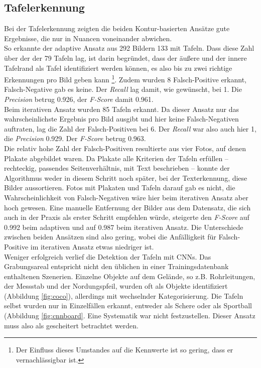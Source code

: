 \subsection{Tafelerkennung}
Bei der Tafelerkennung zeigten  die beiden Kontur-basierten Ansätze gute Ergebnisse, die nur in Nuancen voneinander abwichen.\\
So erkannte der adaptive Ansatz aus 292 Bildern 133 mit Tafeln. Dass diese Zahl über der der 79 Tafeln lag, ist darin begründet, dass der äußere und der innere Tafelrand als Tafel identifiziert werden können, es also bis zu zwei richtige Erkennungen pro Bild geben kann \footnote{Der Einfluss dieses Umstandes auf die Kennwerte ist so gering, dass er vernachlässigbar ist.}. Zudem wurden 8 Falsch-Positive erkannt, Falsch-Negative gab es keine. Der \textit{Recall} lag damit, wie gewünscht, bei 1. Die \textit{Precision} betrug 0.926, der \textit{F-Score} damit 0.961.\\
Beim iterativen Ansatz wurden 85 Tafeln erkannt. Da dieser Ansatz nur das wahrscheinlichste Ergebnis pro Bild ausgibt und hier keine Falsch-Negativen auftraten, lag die Zahl der Falsch-Positiven bei 6. Der \textit{Recall} war also auch hier 1, die \textit{Precision} 0.929. Der \textit{F-Score} betrug 0.963.\\
Die relativ hohe Zahl der Falsch-Positiven resultierte aus vier Fotos, auf denen Plakate abgebildet waren. Da Plakate alle Kriterien der Tafeln erfüllen -- rechteckig, passendes Seitenverhältnis, mit Text beschrieben -- konnte der Algorithmus weder in diesem Schritt noch später, bei der Texterkennung, diese Bilder aussortieren. Fotos mit Plakaten und Tafeln darauf gab es nicht, die Wahrscheinlichkeit von Falsch-Negativen wäre hier beim iterativen Ansatz aber hoch gewesen. Eine manuelle Entfernung der Bilder aus dem Datensatz, die sich auch in der Praxis als erster Schritt empfehlen würde, steigerte den \textit{F-Score} auf 0.992 beim adaptiven und auf 0.987 beim iterativen Ansatz. Die Unterschiede zwischen beiden Ansätzen sind also gering, wobei die Anfälligkeit für Falsch-Positive im iterativen Ansatz etwas niedriger ist. \\

Weniger erfolgreich verlief die Detektion der Tafeln mit CNNs. Das Grabungsareal entspricht nicht den üblichen in einer Trainingsdatenbank enthaltenen Szenerien. Einzelne Objekte auf dem Gelände, so z.B. Rohrleitungen, der Messstab und der Nordungspfeil, wurden oft als Objekte identifiziert (Abbildung \ref{fig:coco}), allerdings mit wechselnder Kategorisierung. Die Tafeln selbst wurden nur in Einzelfällen erkannt, entweder als Schere oder als Sportball (Abbildung \ref{fig:cnnboard}. Eine Systematik war nicht festzustellen. Dieser Ansatz muss also als gescheitert betrachtet werden.

